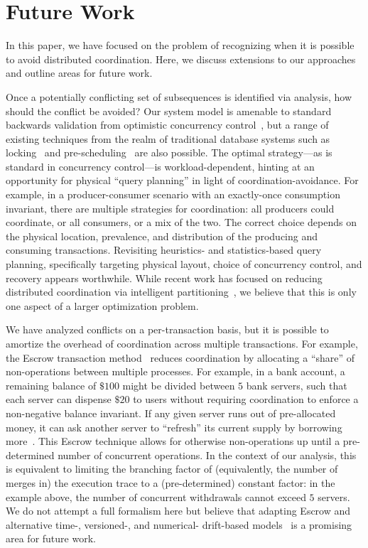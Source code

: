 
\section{Future Work}
\label{sec:discussion}

In this paper, we have focused on the problem of recognizing when it
is possible to avoid distributed coordination. Here, we discuss
extensions to our approaches and outline areas for future work.

 Once a potentially conflicting set of
subsequences is identified via \iconfluence analysis, how should the
conflict be avoided? Our system model is amenable to standard
backwards validation from optimistic concurrency
control~\cite{bernstein-book}, but a range of existing techniques from
the realm of traditional database systems such as
locking~\cite{gray-virtues} and pre-scheduling~\cite{calvin} are also
possible. The optimal strategy---as is standard in concurrency
control---is workload-dependent, hinting at an opportunity for
physical ``query planning'' in light of coordination-avoidance. For
example, in a producer-consumer scenario with an exactly-once
consumption invariant, there are multiple strategies for coordination:
all producers could coordinate, or all consumers, or a mix of the
two. The correct choice depends on the physical location, prevalence,
and distribution of the producing and consuming
transactions. Revisiting heuristics- and statistics-based query
planning, specifically targeting physical layout, choice of
concurrency control, and recovery appears worthwhile. While recent
work has focused on reducing distributed coordination via intelligent
partitioning~\cite{schism}, we believe that this is only one aspect of
a larger optimization problem.

 We have analyzed conflicts on a
per-transaction basis, but it is possible to amortize the overhead of
coordination across multiple transactions. For example, the Escrow
transaction method~\cite{escrow} reduces coordination by allocating a
``share'' of non-\iconfluent operations between multiple
processes. For example, in a bank account, a remaining balance of
$\$100$ might be divided between $5$ bank servers, such that each
server can dispense $\$20$ to users without requiring coordination to
enforce a non-negative balance invariant. If any given server runs out
of pre-allocated money, it can ask another server to ``refresh'' its
current supply by borrowing more~\cite{mdcc}. This Escrow technique
allows \cfreedom for otherwise non-\iconfluent operations up until a
pre-determined number of concurrent operations. In the context of our
\cfreedom analysis, this is equivalent to limiting the branching
factor of (equivalently, the number of merges in) the execution trace
to a (pre-determined) constant factor: in the example above, the
number of concurrent withdrawals cannot exceed $5$ servers. We do not
attempt a full formalism here but believe that adapting Escrow and
alternative time-, versioned-, and numerical- drift-based
models~\cite{yu-conit} is a promising area for future work.

